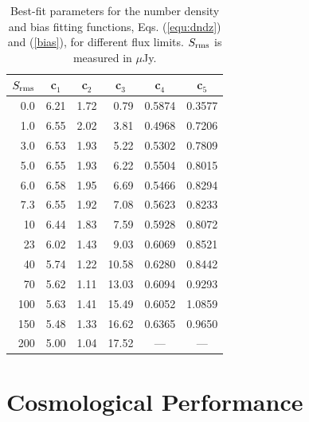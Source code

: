 \documentclass[useAMS,usenatbib]{mn2e}
\begin{document}
\begin{table}
\begin{centering}
{\renewcommand{\arraystretch}{1.5}
\begin{tabular}{rrrrrr}
\hline 
\multicolumn{1}{c}{$S_{\rm rms}$} & \multicolumn{1}{c}{c$_1$} & \multicolumn{1}{c}{c$_2$} & \multicolumn{1}{c}{c$_3$} & \multicolumn{1}{c}{c$_4$} & \multicolumn{1}{c}{c$_5$} \\ 
\hline 
0.0 & 6.21 & 1.72 & 0.79 & 0.5874 & 0.3577 \\
\hline
1.0  & 6.55 & 2.02 &  3.81 & 0.4968 &    0.7206 \\
\hline
3.0 & 6.53 & 1.93&  5.22 & 0.5302 &     0.7809 \\
\hline
5.0  & 6.55 & 1.93 & 6.22 & 0.5504 &    0.8015 \\
\hline
6.0 & 6.58 & 1.95 &  6.69 & 0.5466 &  0.8294 \\
\hline
7.3   & 6.55 & 1.92 &  7.08 & 0.5623 & 0.8233 \\
\hline
10 &  6.44 & 1.83 &  7.59 & 0.5928 &     0.8072 \\
\hline
23 & 6.02  & 1.43 &  9.03 & 0.6069 &  0.8521 \\
\hline
40 & 5.74 & 1.22 &  10.58 & 0.6280 &    0.8442 \\
\hline
70  &5.62 & 1.11 &  13.03 & 0.6094 &    0.9293 \\
\hline
100 &  5.63 & 1.41 & 15.49 & 0.6052 & 1.0859 \\
\hline
150  & 5.48 & 1.33 & 16.62 & 0.6365 & 0.9650 \\
\hline
200 & 5.00 &1.04 & 17.52 & \multicolumn{1}{c}{---} & \multicolumn{1}{c}{---} \\
\hline
\end{tabular} }
\caption{Best-fit parameters for the number density and bias fitting functions, Eqs. (\ref{equ:dndz}) and (\ref{bias}), for different flux limits. $S_{\rm{rms}}$ is measured in $\mu$Jy.}
\label{table:free_parameters}
\end{centering}
\end{table}




\section{Cosmological Performance}
\end{document}
